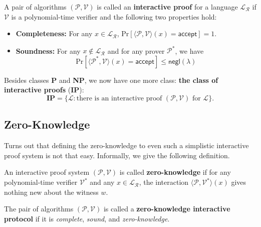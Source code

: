\documentclass[../lecture-notes.tex]{subfiles}
\begin{document}
\begin{definition}
    A pair of algorithms $(\mathcal{P},\mathcal{V})$ is called an \textbf{interactive proof} for a language $\mathcal{L}_{\mathcal{R}}$ if $\mathcal{V}$ is a polynomial-time verifier and the following two properties hold:
    \begin{itemize}
        \item \textbf{Completeness:} For any $x \in \mathcal{L}_{\mathcal{R}}$, $\text{Pr}[\langle \mathcal{P}, \mathcal{V} \rangle(x) = \mathsf{accept}]=1$.
        \item \textbf{Soundness:} For any $x \not\in \mathcal{L}_{\mathcal{R}}$ and for any prover $\mathcal{P}^*$, we have 
        \begin{equation*}
            \text{Pr}[\langle \mathcal{P}^*, \mathcal{V} \rangle(x) = \mathsf{accept}] \leq \mathsf{negl}(\lambda)
        \end{equation*}
    \end{itemize}
\end{definition}

\begin{definition}
    Besides classes \textbf{P} and \textbf{NP}, we now have one more class: \textbf{the class of interactive proofs} (\textbf{IP}):
    \begin{equation*}
        \mathbf{IP} = \{\mathcal{L}: \text{there is an interactive proof $(\mathcal{P}, \mathcal{V})$ for $\mathcal{L}$}\}.
    \end{equation*}
\end{definition}

\subsection{Zero-Knowledge}

Turns out that defining the zero-knowledge to even such a simplistic interactive proof system is not that easy. Informally, we give the following definition.

\begin{definition}
    An interactive proof system $(\mathcal{P}, \mathcal{V})$ is called \textbf{zero-knowledge} if for any polynomial-time verifier $\mathcal{V}^*$ and any $x \in \mathcal{L}_{\mathcal{R}}$, the interaction $\langle \mathcal{P}, \mathcal{V}^* \rangle(x)$ gives nothing new about the witness $w$.
\end{definition}

\begin{definition}
    The pair of algorithms $(\mathcal{P}, \mathcal{V})$ is called a \textbf{zero-knowledge interactive protocol} if it is \textit{complete}, \textit{sound}, and \textit{zero-knowledge}.
\end{definition}
\end{document}
